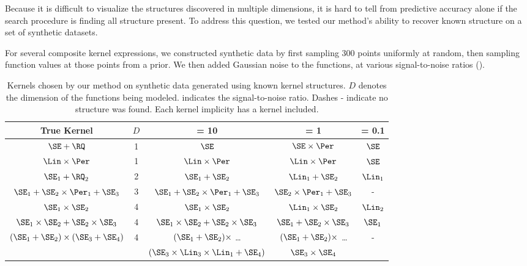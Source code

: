 Because it is difficult to visualize the structures discovered in multiple dimensions, it is hard to tell from predictive accuracy alone if the search procedure is finding all structure present.
To address this question, we tested our method's ability to recover known structure on a set of synthetic datasets.

For several composite kernel expressions, we constructed synthetic data by first sampling 300 points uniformly at random, then sampling function values at those points from a \gp{} prior.
We then added \iid Gaussian noise to the functions, at various signal-to-noise ratios (\SNR{}).


\begin{table}[ht!]
\caption[Kernels recovered on synthetic data]
{
Kernels chosen by our method on synthetic data generated using known kernel structures. $D$ denotes the dimension of the functions being modeled.
\SNR{} indicates the signal-to-noise ratio.
Dashes - indicate no structure was found.
Each kernel implicity has a \kWN{} kernel included.
}
\label{tbl:synthetic}
\begin{center}
{\small
\begin{tabular}{c c | c c c}
True Kernel & $D$ & \SNR{} = 10 & \SNR{} = 1 & \hspace{-1cm} \SNR{} = 0.1 \\
\hline
$\SE + \RQ$        & 1 & $\SE$ & $\SE \times \Per$ & $\SE$ \\
$\Lin \times \Per$ & 1 & $\Lin \times \Per$ & $\Lin \times \Per$ & $\SE$ \\
$\SE_1 + \RQ_2$    & 2 & $\SE_1 + \SE_2$ & $\Lin_1 + \SE_2$ & $\Lin_1$ \\
$\SE_1 + \SE_2 \times \Per_1 + \SE_3$ & 3 & $\SE_1 + \SE_2 \times \Per_1 + \SE_3$ & $\SE_2 \times \Per_1 + \SE_3$ & - \\
$\SE_1 \times \SE_2$ & 4 & $\SE_1 \times \SE_2$ & $\Lin_1 \times \SE_2$ & $\Lin_2$ \\
$\SE_1 \times \SE_2 + \SE_2 \times \SE_3$ & 4 & $\SE_1 \times \SE_2 + \SE_2 \times \SE_3$ & $\SE_1 + \SE_2 \times \SE_3$ & $\SE_1$ \\
\multirow{2}{*}{ $(\SE_1 + \SE_2) \times (\SE_3 + \SE_4)$ } & \multirow{2}{*}{4} & $(\SE_1 + \SE_2) \times$ \dots & $(\SE_1 + \SE_2) \times$ \dots & \multirow{2}{*}{-} \\
 & & $(\SE_3\times\Lin_3\times\Lin_1 + \SE_4)$ & $\SE_3 \times \SE_4$ &
\end{tabular}
}
\end{center}
\end{table}


